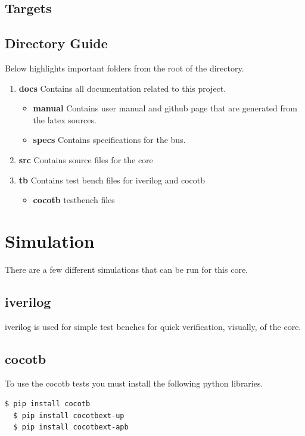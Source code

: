 \subsection{Targets}



\subsection{Directory Guide}

\par
Below highlights important folders from the root of the directory.

\begin{enumerate}
  \item \textbf{docs} Contains all documentation related to this project.
    \begin{itemize}
      \item \textbf{manual} Contains user manual and github page that are generated from the latex sources.
      \item \textbf{specs} Contains specifications for the bus.
    \end{itemize}
  \item \textbf{src} Contains source files for the core
  \item \textbf{tb} Contains test bench files for iverilog and cocotb
    \begin{itemize}
      \item \textbf{cocotb} testbench files
    \end{itemize}
\end{enumerate}

\newpage

\section{Simulation}
\par
There are a few different simulations that can be run for this core.

\subsection{iverilog}
\par
iverilog is used for simple test benches for quick verification, visually, of the core.

\subsection{cocotb}
\par
To use the cocotb tests you must install the following python libraries.
\begin{lstlisting}[language=bash]
  $ pip install cocotb
  $ pip install cocotbext-up
  $ pip install cocotbext-apb
\end{lstlisting}

